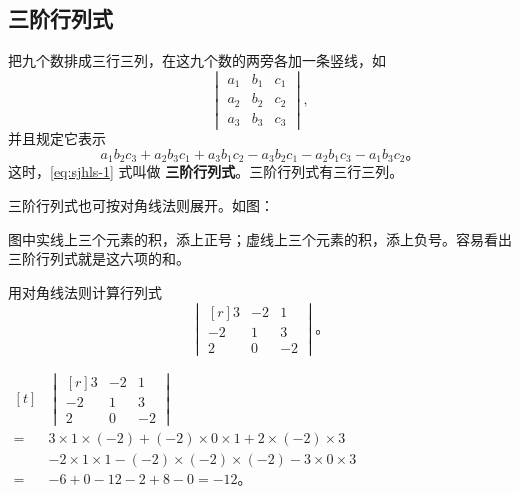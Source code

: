 \subsection{三阶行列式}\label{subsec:4-2}

把九个数排成三行三列，在这九个数的两旁各加一条竖线，如
\begin{equation}
    \begin{vmatrix}
        a_1 & b_1 & c_1 \\
        a_2 & b_2 & c_2 \\
        a_3 & b_3 & c_3
    \end{vmatrix}, \label{eq:sjhls-1}
\end{equation}
并且规定它表示
\begin{equation}
    a_1b_2c_3 + a_2b_3c_1 + a_3b_1c_2 - a_3b_2c_1 - a_2b_1c_3 - a_1b_3c_2 \text{。} \label{eq:sjhls-2}
\end{equation}
这时，\eqref{eq:sjhls-1} 式叫做 \textbf{三阶行列式}。三阶行列式有三行三列。

三阶行列式也可按对角线法则展开。如图：

\begin{figure}[H]
    \centering
    
\end{figure}


图中实线上三个元素的积，添上正号；虚线上三个元素的积，添上负号。容易看出三阶行列式就是这六项的和。

\liti 用对角线法则计算行列式
$$\begin{vmatrix*}[r]
    3  & -2 & 1 \\
    -2 & 1  & 3 \\
    2  & 0  & -2
\end{vmatrix*} \text{。} $$

\jie $\begin{aligned}[t]
    & \begin{vmatrix*}[r]
        3  & -2 & 1 \\
        -2 & 1  & 3 \\
        2  & 0  & -2
    \end{vmatrix*} \\
    ={} & 3 \times 1 \times (-2) + (-2) \times 0 \times 1 + 2 \times (-2) \times 3 \\
        & -2 \times 1 \times 1 - (-2) \times (-2) \times (-2) - 3 \times 0 \times 3 \\
    ={} & -6 + 0 -12 - 2 + 8 - 0 = -12 \text{。}
\end{aligned}$


